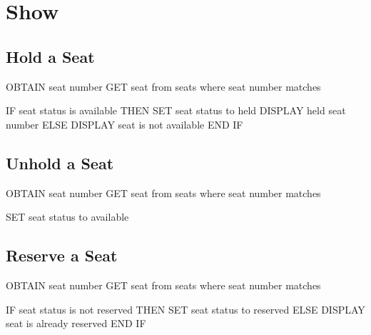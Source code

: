 \section{Show}

\subsection{Hold a Seat}
\begin{pc}
OBTAIN seat number
GET seat from seats where seat number matches

IF seat status is available THEN
    SET seat status to held
    DISPLAY held seat number
ELSE
    DISPLAY seat is not available
END IF
\end{pc}

\subsection{Unhold a Seat}
\begin{pc}
OBTAIN seat number
GET seat from seats where seat number matches

SET seat status to available
\end{pc}

\subsection{Reserve a Seat}
\begin{pc}
OBTAIN seat number
GET seat from seats where seat number matches

IF seat status is not reserved THEN
    SET seat status to reserved
ELSE
    DISPLAY seat is already reserved
END IF
\end{pc}
